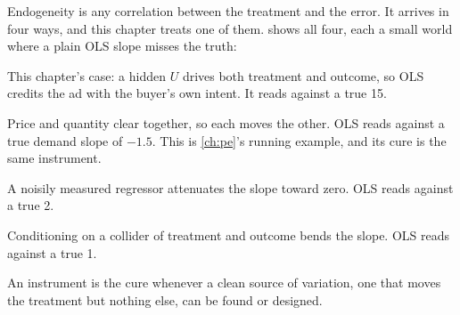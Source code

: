 Endogeneity is any correlation between the treatment and the error. It arrives in four ways, and
this chapter treats one of them.  shows all four, each a small world where a
plain OLS slope misses the truth:
%
\begin{description}[leftmargin=*, style=nextline]
  \item[Omitted variable, or selection.] This chapter's case: a hidden $U$ drives both treatment and
    outcome, so OLS credits the ad with the buyer's own intent. It reads \eur{\nbElevenFaceOvb}
    against a true 15.
  \item[Simultaneity, or reverse causation.] Price and quantity clear together, so each moves the
    other. OLS reads \nbElevenFaceSim{} against a true demand slope of $-1.5$. This is
    \cref{ch:pe}'s running example, and its cure is the same instrument.
  \item[Measurement error.] A noisily measured regressor attenuates the slope toward zero. OLS reads
    \nbElevenFaceMe{} against a true 2.
  \item[Selection on the outcome.] Conditioning on a collider of treatment and outcome bends the
    slope. OLS reads \nbElevenFaceSel{} against a true 1.
\end{description}
%
An instrument is the cure whenever a clean source of variation, one that moves the treatment but
nothing else, can be found or designed.


